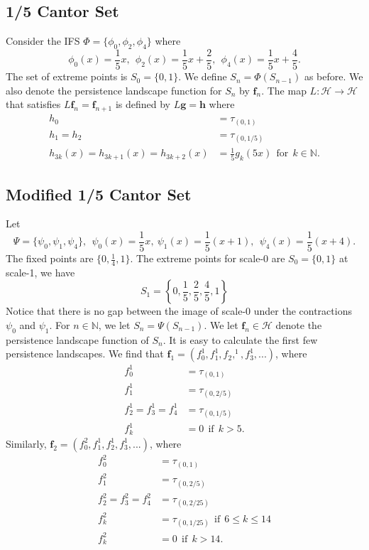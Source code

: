 \documentclass [52pt] {article}
\newcommand{\N}{\mathbb{N}}
\newcommand{\Hil}{\mathcal{H}}
\begin{document}
\subsection{1/5 Cantor Set}
Consider the IFS $\Phi = \{\phi_0,\phi_2,\phi_4\}$ where
\[\phi_0(x) = \frac{1}{5}x,\:\:\phi_2(x) = \frac{1}{5}x+\frac{2}{5},\:\:\phi_4(x) = \frac{1}{5}x+\frac{4}{5}.\]
The set of extreme points is $S_0 = \{0,1\}$.  We define $S_n = \Phi(S_{n-1})$ as before.  We also denote the persistence landscape function for $S_n$ by $\mathbf{f}_n$.  The map $L:\Hil\to\Hil$ that satisfies $L\mathbf{f}_n = \mathbf{f}_{n+1}$ is defined by $L\mathbf{g} = \mathbf{h}$ where
\[\begin{split}
h_0 &= \tau_{(0,1)}\\
h_1 = h_2 &= \tau_{(0,1/5)}\\
h_{3k}(x) = h_{3k+1}(x) = h_{3k+2}(x) &= \frac{1}{5}g_k(5x)\:\:\text{for}\:\:k\in\mathbb{N}.
\end{split}\]

\subsection{Modified 1/5 Cantor Set}\label{sec : mod1/5}

Let 
\[\Psi = \{\psi_0,\psi_1,\psi_4\},\:\:\psi_0(x) = \frac{1}{5}x,\:\psi_1(x) = \frac{1}{5}(x+1),\:\:\psi_4(x) = \frac{1}{5}(x+4).\]
The fixed points are $\{0,\frac{1}{4},1\}$.  The extreme points for scale-0 are $S_0=\{0,1\}$ at scale-1, we have
\[S_1=\left\{0,\frac{1}{5}, \frac{2}{5},\frac{4}{5},1\right\}\]
Notice that there is no gap between the image of scale-0 under the contractions $\psi_0$ and $\psi_1$.  For $n\in\N$, we let $S_n =\Psi( S_{n-1})$.  We let $\mathbf{f}_n\in\Hil$ denote the persistence landscape function of $S_n$.  It is easy to calculate the first few persistence landscapes.  We find that $\mathbf{f}_1 = (f_0^1, f_1^1,f_2,^1,f_3^1,...)$, where
\[\begin{split}
f_0^1 &= \tau_{(0,1)}\\
f_1^1 &= \tau_{(0,2/5)}\\
f_2^1=f_3^1=f_4^1 &= \tau_{(0,1/5)}\\
f_k^1 &=0\:\:\text{if}\:\: k>5.
\end{split}\]
Similarly, $\mathbf{f}_2 = (f_0^2,f_1^1,f_2^1,f_3^1,...)$, where
\[\begin{split}
f_0^2 &= \tau_{(0,1)}\\
f_1^2 &= \tau_{(0,2/5)}\\
f_2^2=f_3^2=f_4^2 &= \tau_{(0,2/25)}\\
f_k^2 &=\tau_{(0,1/25)}\:\:\text{if}\:\: 6\le k\le 14\\
f_k^2 & = 0\:\:\text{if}\:\:k>14.
\end{split}\]
\end{document}
